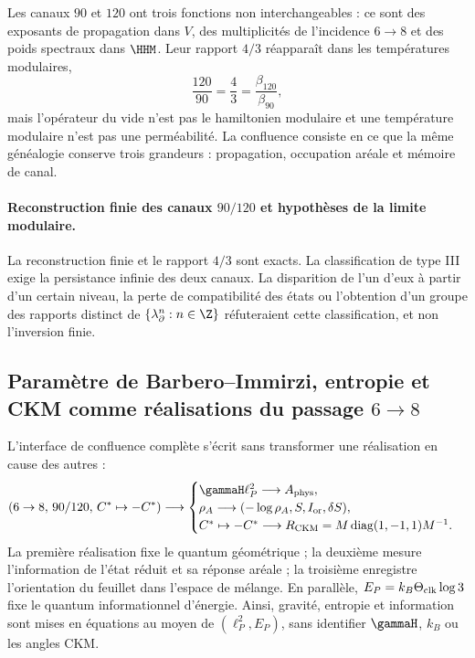Les canaux \(90\) et \(120\) ont trois fonctions non interchangeables :
ce sont des exposants de propagation dans \(V\), des multiplicités de l'incidence
\(6\to8\) et des poids spectraux dans \(\HHM\). Leur rapport \(4/3\) réapparaît dans
les températures modulaires,
\[
\frac{120}{90}=\frac43=\frac{\beta_{120}}{\beta_{90}},
\]
mais l'opérateur du vide n'est pas le hamiltonien modulaire et une température
modulaire n'est pas une perméabilité. La confluence consiste en ce que la même
généalogie conserve trois grandeurs : propagation, occupation aréale et
mémoire de canal.

\paragraph{Reconstruction finie des canaux \(90/120\) et hypothèses de la limite modulaire.}
La reconstruction finie et le rapport \(4/3\) sont exacts. La classification
de type III exige la persistance infinie des deux canaux. La disparition de l'un
d'eux à partir d'un certain niveau, la perte de compatibilité des états ou l'obtention
d'un groupe des rapports distinct de
\(\{\lambda_\partial^n:n\in\Z\}\) réfuteraient cette classification, et non
l'inversion finie.

\subsection{Paramètre de Barbero--Immirzi, entropie et CKM comme réalisations du passage \(6\to8\)}

L'interface de confluence complète s'écrit sans transformer une
réalisation en cause des autres :
\begin{equation}
(6\to8,\,90/120,\,C^*\mapsto-C^*)\longrightarrow
\begin{cases}
\gammaH\ell_P^2\longrightarrow A_{\rm phys},\\
\rho_A\longrightarrow(-\log\rho_A,S,I_{\rm or},\delta S),\\
C^*\mapsto-C^*\longrightarrow
R_{\rm CKM}=M\operatorname{diag}(1,-1,1)M^{-1}.
\end{cases}
\label{eq:atlas-bic-entropy-ckm}
\end{equation}
La première réalisation fixe le quantum géométrique ; la deuxième mesure
l'information de l'état réduit et sa réponse aréale ; la troisième enregistre
l'orientation du feuillet dans
l'espace de mélange. En parallèle,
\(E_P=k_B\Theta_{\rm clk}\log3\) fixe le quantum informationnel d'énergie.
Ainsi, gravité, entropie et information sont mises en équations au moyen de
\((\ell_P^2,E_P)\), sans identifier \(\gammaH\), \(k_B\) ou les angles CKM.

